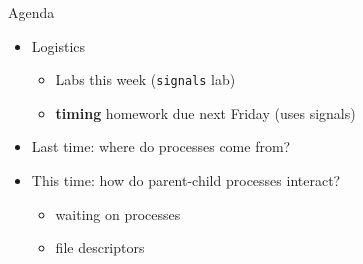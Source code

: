 \begin{frame}{Agenda}
    \begin{itemize}
        \item Logistics
            \begin{itemize}
            \item Labs this week (\texttt{signals} lab)
            \item \textbf{timing} homework due next Friday (uses signals)
            \end{itemize}
        \item Last time: where do processes come from?
        \item This time: how do parent-child processes interact?
            \begin{itemize}
                \item waiting on processes
                \item file descriptors
            \end{itemize}
    \end{itemize}
\end{frame}